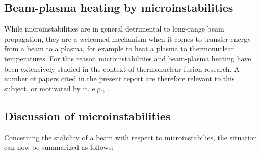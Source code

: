 \documentclass [12pt,a4paper,     ]{report} %
\begin{document}
\subsection{Beam-plasma heating by microinstabilities}

While microinstabilities are in general detrimental to long-range beam propagation, they are a welcomed mechanism when it comes to transfer energy from a beam to a plasma, for example to heat a plasma to thermonuclear temperatures.  For this reason microinstabilities and beam-plasma heating have been extensively studied in the context of thermonuclear fusion research.  A number of papers cited in the present report are therefore relevant to this subject, or motivated by it, e.g., \cite{IYYEN1989-,HAMME1979-,HAAN-1982-,JANNS1984-,VENUG1992-}.



\subsection{Discussion of microinstabilities}

	Concerning the stability of a beam with respect to microinstabilies, the situation can now be summarized as follows:
\end{document}
